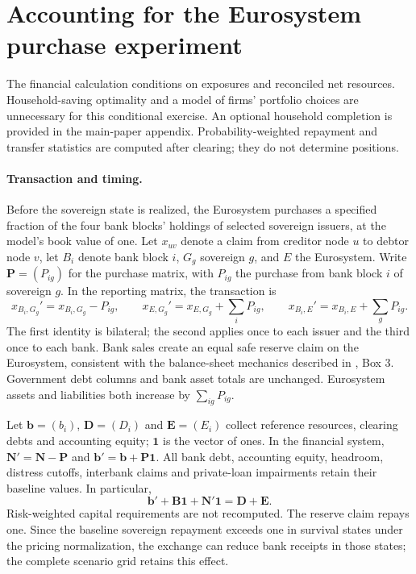 \section{Accounting for the Eurosystem purchase experiment}
\label{app:eurosystem-purchases}

The financial calculation conditions on exposures and reconciled net resources. Household-saving optimality and a model of firms' portfolio choices are unnecessary for this conditional exercise. An optional household completion is provided in the main-paper appendix. Probability-weighted repayment and transfer statistics are computed after clearing; they do not determine positions.

\paragraph{Transaction and timing.}
Before the sovereign state is realized, the Eurosystem purchases a specified fraction of the four bank blocks' holdings of selected sovereign issuers, at the model's book value of one. Let $x_{uv}$ denote a claim from creditor node $u$ to debtor node $v$, let $B_i$ denote bank block $i$, $G_g$ sovereign $g$, and $E$ the Eurosystem. Write $\mathbf{P}=(P_{ig})$ for the purchase matrix, with $P_{ig}$ the purchase from bank block $i$ of sovereign $g$. In the reporting matrix, the transaction is
\[
 x_{B_i,G_g}'=x_{B_i,G_g}-P_{ig},\qquad
 x_{E,G_g}'=x_{E,G_g}+\sum_iP_{ig},\qquad
 x_{B_i,E}'=x_{B_i,E}+\sum_gP_{ig}.
\]
The first identity is bilateral; the second applies once to each issuer and the third once to each bank. Bank sales create an equal safe reserve claim on the Eurosystem, consistent with the balance-sheet mechanics described in \citet{ECBReserves2021}, Box 3. Government debt columns and bank asset totals are unchanged. Eurosystem assets and liabilities both increase by $\sum_{ig}P_{ig}$.

Let $\mathbf{b}=(b_i)$, $\mathbf{D}=(D_i)$ and $\mathbf{E}=(E_i)$ collect reference resources, clearing debts and accounting equity; $\mathbf1$ is the vector of ones. In the financial system, $\mathbf{N}'=\mathbf{N}-\mathbf{P}$ and $\mathbf{b}'=\mathbf{b}+\mathbf{P}\mathbf1$. All bank debt, accounting equity, headroom, distress cutoffs, interbank claims and private-loan impairments retain their baseline values. In particular,
\[
 \mathbf{b}'+\mathbf{B}\mathbf1+\mathbf{N}'\mathbf1=\mathbf{D}+\mathbf{E}.
\]
Risk-weighted capital requirements are not recomputed. The reserve claim repays one. Since the baseline sovereign repayment exceeds one in survival states under the pricing normalization, the exchange can reduce bank receipts in those states; the complete scenario grid retains this effect.

